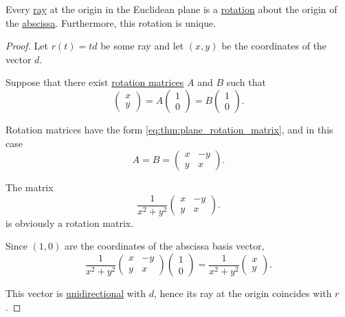\begin{proposition}\label{thm:plane_ray_abscissa_rotation}
  Every \hyperref[def:geometric_ray]{ray} at the origin in the Euclidean plane is a \hyperref[def:rigid_motion/rotation]{rotation} about the origin of the \hyperref[rem:xyz]{abscissa}. Furthermore, this rotation is unique.
\end{proposition}
\begin{proof}
  Let \( r(t) = td \) be some ray and let \( (x, y) \) be the coordinates of the vector \( d \).

  \UniquenessSubProof Suppose that there exist \hyperref[thm:plane_rotation_matrix]{rotation matrices} \( A \) and \( B \) such that
  \begin{equation*}
    \begin{pmatrix} x \\ y \end{pmatrix} = A \begin{pmatrix} 1 \\ 0 \end{pmatrix} = B \begin{pmatrix} 1 \\ 0 \end{pmatrix}.
  \end{equation*}

  Rotation matrices have the form \eqref{eq:thm:plane_rotation_matrix}, and in this case
  \begin{equation*}
    A = B = \begin{pmatrix}
      x & -y \\
      y & x
    \end{pmatrix}.
  \end{equation*}

  \ExistenceSubProof The matrix
  \begin{equation*}
    \frac 1 {x^2 + y^2}
    \begin{pmatrix}
      x & -y \\
      y & x
    \end{pmatrix}.
  \end{equation*}
  is obviously a rotation matrix.

  Since \( (1, 0) \) are the coordinates of the abscissa basis vector,
  \begin{equation*}
    \frac 1 {x^2 + y^2}
    \begin{pmatrix}
      x & -y \\
      y & x
    \end{pmatrix}
    \begin{pmatrix}
      1 \\ 0
    \end{pmatrix}
    =
    \frac 1 {x^2 + y^2}
    \begin{pmatrix}
      x \\ y
    \end{pmatrix}.
  \end{equation*}

  This vector is \hyperref[def:geometric_ray/unidirectional]{unidirectional} with \( d \), hence its ray at the origin coincides with \( r \).
\end{proof}

